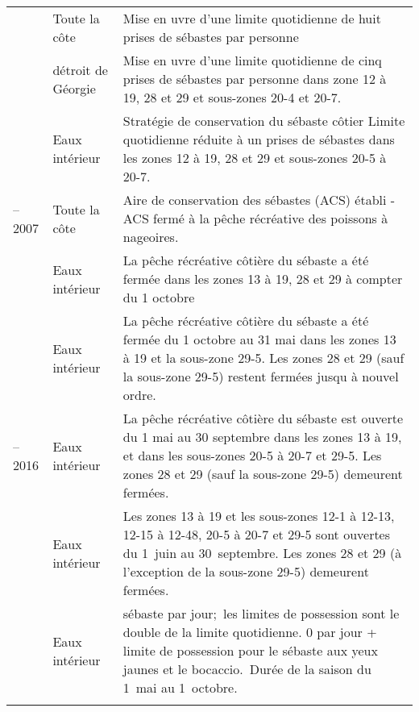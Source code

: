 \documentclass[french,11pt]{book}
\begin{document}
\begin{longtable}[t]{>{\raggedright\arraybackslash}p{3.5cm}>{\raggedright\arraybackslash}p{3.5cm}>{\raggedright\arraybackslash}p{7.5cm}}
\endfoot
\bottomrule
\endlastfoot
1986 & Toute la côte & Mise en uvre d'une limite quotidienne de huit prises de sébastes par personne\\
1992 & détroit de Géorgie & Mise en uvre d'une limite quotidienne de cinq prises de sébastes par personne dans zone 12 à 19, 28 et 29 et sous-zones 20-4 et 20-7.\\
2002 & Eaux intérieur & Stratégie de conservation du sébaste côtier Limite quotidienne réduite à un prises de sébastes dans les zones 12 à 19, 28 et 29 et sous-zones 20-5 à 20-7.\\
2002--2007 & Toute la côte & Aire de conservation des sébastes (ACS) établi - ACS fermé à la pêche récréative des poissons à nageoires.\\
2006 & Eaux intérieur & La pêche récréative côtière du sébaste a été fermée dans les zones 13 à 19, 28 et 29 à compter du 1 octobre\\
2007 & Eaux intérieur & La pêche récréative côtière du sébaste a été fermée du 1 octobre au 31 mai dans les zones 13 à 19 et la sous-zone 29-5. Les zones 28 et 29 (sauf la sous-zone 29-5) restent fermées jusqu à nouvel ordre.\\
2008--2016 & Eaux intérieur & La pêche récréative côtière du sébaste est ouverte du 1 mai au 30 septembre dans les zones 13 à 19, et dans les sous-zones 20-5 à 20-7 et 29-5. Les zones 28 et 29 (sauf la sous-zone 29-5) demeurent fermées.\\
2017 & Eaux intérieur & Les zones 13 à 19 et les sous-zones 12-1 à 12-13, 12-15 à 12-48, 20-5 à 20-7 et 29-5 sont ouvertes du 1 juin au 30 septembre. Les zones 28 et 29 (à l'exception de la sous-zone 29-5) demeurent fermées.\\
2019 & Eaux intérieur & 1 sébaste par jour; les limites de possession sont le double de la limite quotidienne. 0 par jour + limite de possession pour le sébaste aux yeux jaunes et le bocaccio. Durée de la saison du 1 mai au 1 octobre.\\*
\end{longtable}
\clearpage


\clearpage

\label{app:desc-om-yelloweye}
\end{document}
